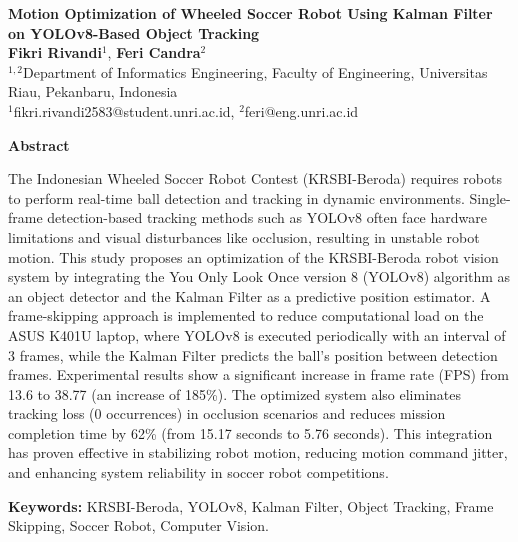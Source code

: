 \documentclass[12pt,a4paper]{article}
\begin{document}
\begin{center}
    {\LARGE \textbf{Motion Optimization of Wheeled Soccer Robot Using Kalman Filter on YOLOv8-Based Object Tracking}} \\[1cm]
    
    {\large \textbf{Fikri Rivandi}$^{1}$, \textbf{Feri Candra}$^{2}$} \\[0.3cm]
    {\normalsize $^{1,2}$Department of Informatics Engineering, Faculty of Engineering, Universitas Riau, Pekanbaru, Indonesia} \\[0.2cm]
    {\normalsize $^{1}$fikri.rivandi2583@student.unri.ac.id, $^{2}$feri@eng.unri.ac.id}
\end{center}

\vspace{0.5cm}

\begin{center}
    {\large \textbf{Abstract}}
\end{center}
\noindent
The Indonesian Wheeled Soccer Robot Contest (KRSBI-Beroda) requires robots to perform real-time ball detection and tracking in dynamic environments. Single-frame detection-based tracking methods such as YOLOv8 often face hardware limitations and visual disturbances like occlusion, resulting in unstable robot motion. This study proposes an optimization of the KRSBI-Beroda robot vision system by integrating the You Only Look Once version 8 (YOLOv8) algorithm as an object detector and the Kalman Filter as a predictive position estimator. A frame-skipping approach is implemented to reduce computational load on the ASUS K401U laptop, where YOLOv8 is executed periodically with an interval of 3 frames, while the Kalman Filter predicts the ball's position between detection frames. Experimental results show a significant increase in frame rate (FPS) from 13.6 to 38.77 (an increase of 185\%). The optimized system also eliminates tracking loss (0 occurrences) in occlusion scenarios and reduces mission completion time by 62\% (from 15.17 seconds to 5.76 seconds). This integration has proven effective in stabilizing robot motion, reducing motion command jitter, and enhancing system reliability in soccer robot competitions.

\vspace{0.3cm}
\textbf{Keywords:} KRSBI-Beroda, YOLOv8, Kalman Filter, Object Tracking, Frame Skipping, Soccer Robot, Computer Vision.

\vspace{0.5cm}
\end{document}
